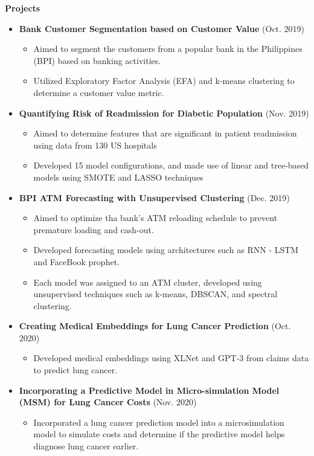\documentclass[letterpaper,11pt]{article}
\newcommand{\resitem}[1]{\item #1 \vspace{-2pt}}
\newcommand{\resheading}[1]{{\large \colorbox{mygrey}{\begin{minipage}{\textwidth}{\textbf{#1 \vphantom{p\^{E}}}}\end{minipage}}}}
\begin{document}
\resheading{Projects}
\begin{itemize}
    \item \textbf{Bank Customer Segmentation based on Customer Value} (Oct. 2019)\vspace{-5pt}
        \begin{itemize}
    		\resitem{Aimed to segment the customers from a popular bank in the Philippines (BPI) based on banking activities.}
    		\resitem{Utilized Exploratory Factor Analysis (EFA) and k-means clustering to determine a customer value metric.}
        \end{itemize}
    \item \textbf{Quantifying Risk of Readmission for Diabetic Population} (Nov. 2019)\vspace{-5pt}
        \begin{itemize}
    		\resitem{Aimed to determine features that are significant in patient readmission using data from 130 US hospitals}
    		\resitem{Developed 15 model configurations, and made use of linear and tree-based models using SMOTE and LASSO techniques}
        \end{itemize}
    \item \textbf{BPI ATM Forecasting with Unsupervised Clustering} (Dec. 2019)\vspace{-5pt}
        \begin{itemize}
    		\resitem{Aimed to optimize tha bank's ATM reloading schedule to prevent premature loading and cash-out.}
    		\resitem{Developed forecasting models using architectures such as RNN - LSTM and FaceBook prophet.}
    		\resitem{Each model was assigned to an ATM cluster, developed using unsupervised techniques such as k-means, DBSCAN, and spectral clustering.}
        \end{itemize}
    \item \textbf{Creating Medical Embeddings for Lung Cancer Prediction} (Oct. 2020)\vspace{-5pt}
        \begin{itemize}
    		\resitem{Developed medical embeddings using XLNet and GPT-3 from claims data to predict lung cancer.}
        \end{itemize}
    \item \textbf{Incorporating a Predictive Model in Micro-simulation Model (MSM) for Lung Cancer Costs} (Nov. 2020)\vspace{-5pt}
        \begin{itemize}
    		\resitem{Incorporated a lung cancer prediction model into a microsimulation model to simulate costs and determine if the predictive model helps diagnose lung cancer earlier.}

\end{itemize}
\end{itemize}
\end{document}
